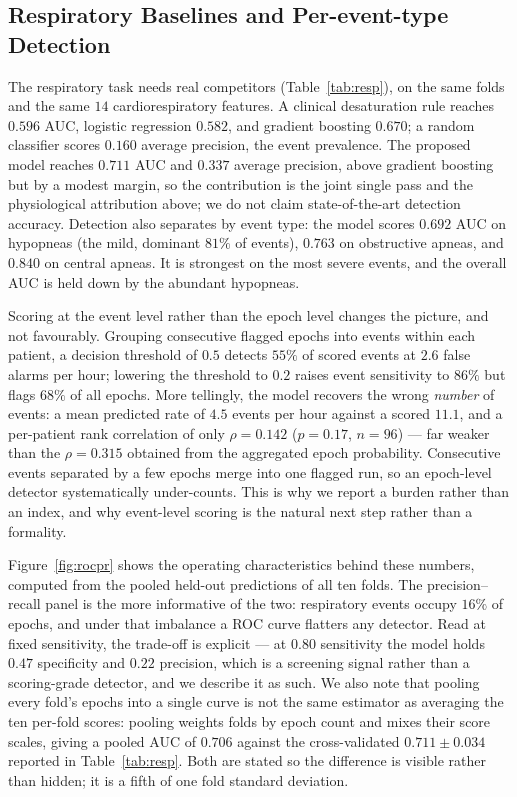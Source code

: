\documentclass[journal]{IEEEtran}
\newcommand{\mmAuc}{0.711}
\newcommand{\mmAp}{0.337}
\begin{document}
\subsection{Respiratory Baselines and Per-event-type Detection}
The respiratory task needs real competitors (Table~\ref{tab:resp}), on the same folds and the same $14$
cardiorespiratory features. A clinical desaturation rule reaches $0.596$ AUC, logistic
regression $0.582$, and gradient boosting $0.670$; a random classifier scores $0.160$ average
precision, the event prevalence. The proposed model reaches $\mmAuc$ AUC and $\mmAp$ average
precision, above gradient boosting but by a modest margin, so the contribution is the joint
single pass and the physiological attribution above; we do not claim state-of-the-art
detection accuracy. Detection also separates by event type: the model scores $0.692$ AUC on hypopneas (the
mild, dominant $81\%$ of events), $0.763$ on obstructive apneas, and $0.840$ on central apneas.
It is strongest on the most severe events, and the overall AUC is held down by the abundant
hypopneas.

Scoring at the event level rather than the epoch level changes the picture, and not
favourably. Grouping consecutive flagged epochs into events within each patient, a decision
threshold of $0.5$ detects $55\%$ of scored events at $2.6$ false alarms per hour; lowering the
threshold to $0.2$ raises event sensitivity to $86\%$ but flags $68\%$ of all epochs. More
tellingly, the model recovers the wrong \emph{number} of events: a mean predicted rate of $4.5$
events per hour against a scored $11.1$, and a per-patient rank correlation of only
$\rho=0.142$ ($p=0.17$, $n=96$) --- far weaker than the $\rho=0.315$ obtained from the
aggregated epoch probability. Consecutive events separated by a few epochs merge into one
flagged run, so an epoch-level detector systematically under-counts. This is why we report a
burden rather than an index, and why event-level scoring is the natural next step rather than a
formality.

Figure~\ref{fig:rocpr} shows the operating characteristics behind these numbers, computed
from the pooled held-out predictions of all ten folds. The precision--recall panel is the
more informative of the two: respiratory events occupy $16\%$ of epochs, and under that
imbalance a ROC curve flatters any detector. Read at fixed sensitivity, the trade-off is
explicit --- at $0.80$ sensitivity the model holds $0.47$ specificity and $0.22$ precision,
which is a screening signal rather than a scoring-grade detector, and we describe it as
such. We also note that pooling every fold's epochs into a single curve is not the same
estimator as averaging the ten per-fold scores: pooling weights folds by epoch count and
mixes their score scales, giving a pooled AUC of $0.706$ against the cross-validated
$\mmAuc \pm 0.034$ reported in Table~\ref{tab:resp}. Both are stated so the difference is
visible rather than hidden; it is a fifth of one fold standard deviation.
\end{document}
